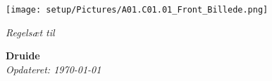 \documentclass[11pt,a4paper,openright]{report}
\begin{document}
\begin{titlepage}
    \begin{center}
        \texttt{[image: setup/Pictures/A01.C01.01\_Front\_Billede.png]}
        
        \vspace{0.5cm}
        \LARGE
        \textit{Regelsæt til}
        
        \vspace{4.5cm}
        \Huge
        \textbf{Druide}\\
        \vspace{4.5cm}
        \large
        \textit{Opdateret: \today}
\end{center}
\end{titlepage}

\pagestyle{plain} %
\renewcommand*\contentsname{Indholdsfortegnelse}
\tableofcontents









\end{document}
